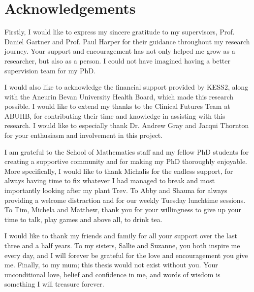 \documentclass[../thesis.tex]{subfiles}
\begin{document}
\thispagestyle{empty}

\chapter*{\textbf{Acknowledgements}}

  \begin{onehalfspace} 
Firstly, I would like to express my sincere gratitude to my supervisors, Prof. Daniel Gartner and Prof. Paul Harper for their guidance throughout my research journey. Your support and encouragement has not only helped me grow as a researcher, but also as a person. I could not have imagined having a better supervision team for my PhD.

I would also like to acknowledge the financial support provided by KESS2, along with the Aneurin Bevan University Health Board, which made this research possible. I would like to extend my thanks to the Clinical Futures Team at ABUHB, for contributing their time and knowledge in assisting with this research. I would like to especially thank Dr. Andrew Gray and Jacqui Thornton for your enthusiasm and involvement in this project.

I am grateful to the School of Mathematics staff and my fellow PhD students for creating a supportive community and for making my PhD thoroughly enjoyable. More specifically, I would like to thank Michalis for the endless support, for always having time to fix whatever I had managed to break and most importantly looking after my plant Trev. To Abby and Shauna for always providing a welcome distraction and for our weekly Tuesday lunchtime sessions. To Tim, Michela and Matthew, thank you for your willingness to give up your time to talk, play games and above all, to drink tea.

I would like to thank my friends and family for all your support over the last three and a half years. To my sisters, Sallie and Suzanne, you both inspire me every day, and I will forever be grateful for the love and encouragement you give me. Finally, to my mum; this thesis would not exist without you. Your unconditional love, belief and confidence in me, and words of wisdom is something I will treasure forever.

\end{onehalfspace}
\vfill

\end{document}
